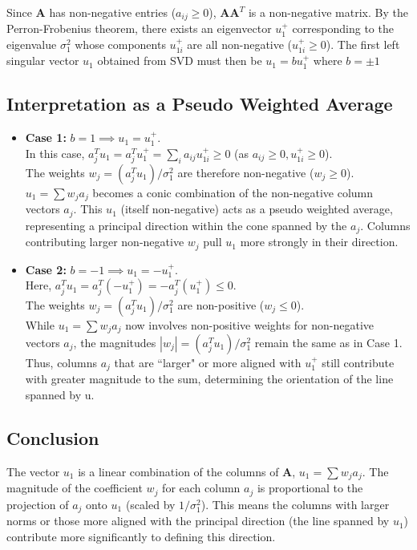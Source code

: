 Since $\mathbf{A}$ has non-negative entries ($a_{ij} \geq 0$), $\mathbf{AA}^T$
is a non-negative matrix. By the Perron-Frobenius theorem, there exists an
eigenvector $u_1^+$ corresponding to the eigenvalue $\sigma_1^2$ whose
components $u_{1i}^+$ are all non-negative ($u_{1i}^+ \geq 0$). The first left
singular vector $u_1$ obtained from SVD must then be $u_1 = bu_1^+$ where $b =
\pm 1$

\subsection{Interpretation as a Pseudo Weighted Average}
\begin{itemize}
    \item \textbf{Case 1:} $b = 1 \implies u_1 = u_1^+$.\\
    In this case, $a_j^Tu_1 = a_j^Tu_1^+ = \sum_i a_{ij}u_{1i}^+ \geq 0$ (as
    $a_{ij} \geq 0, u_{1i}^+ \geq 0$).\\
    The weights $w_j = (a_j^Tu_1)/\sigma_1^2$ are therefore non-negative ($w_j
    \geq 0$).\\
    $u_1 = \sum w_ja_j$ becomes a conic combination of the non-negative column
    vectors $a_j$. This $u_1$ (itself non-negative) acts as a pseudo weighted
    average, representing a principal direction within the cone spanned by the
    $a_j$. Columns contributing larger non-negative $w_j$ pull $u_1$ more
    strongly in their direction.
    \item \textbf{Case 2:} $b = -1 \implies u_1 = -u_1^+$.\\
    Here, $a_j^Tu_1 = a_j^T(-u_1^+) =  - a_j^T(u_1^+) \leq 0$.\\
    The weights $w_j = (a_j^Tu_1)/\sigma_1^2$ are non-positive ($w_j \leq 0$).\\
    While $u_1 = \sum w_ja_j$ now involves non-positive weights for non-negative
    vectors $a_j$, the magnitudes $|w_j| = (a_j^Tu_1)/\sigma_1^2$ remain the
    same as in Case 1. Thus, columns $a_j$ that are ``larger" or more aligned
    with $u_1^+$ still contribute with greater magnitude to the sum, determining
    the orientation of the line spanned by u.
\end{itemize}

\subsection{Conclusion}
The vector $u_1$ is a linear combination of the columns of $\mathbf{A}$, $u_1 =
\sum w_j a_j$. The magnitude of the coefficient $w_j$ for each column $a_j$ is
proportional to the projection of $a_j$ onto $u_1$ (scaled by $1/\sigma_1^2$).
This means the columns with larger norms or those more aligned with the
principal direction (the line spanned by $u_1$) contribute more significantly to
defining this direction.

